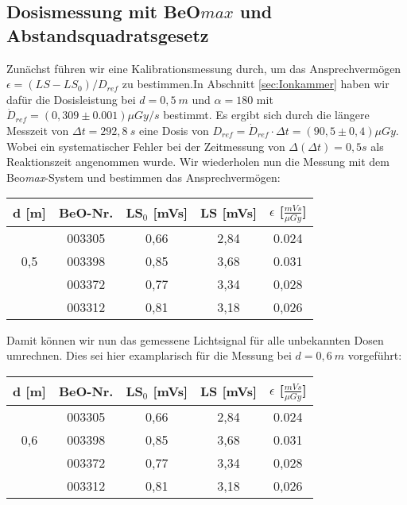 \subsection{Dosismessung mit BeO$max$ und Abstandsquadratsgesetz}
Zunächst führen wir eine Kalibrationsmessung durch, um das Ansprechvermögen $\epsilon = (LS - LS_0)/D_{ref}$ zu bestimmen.In Abschnitt \ref{sec:Ionkammer} haben wir dafür die Dosisleistung bei $d=0,5\ m$ und $\alpha = 180$ \textdegree  mit $\dot{D}_{ref} = (0,309 \pm 0.001)\mu Gy /s$ bestimmt. Es ergibt sich durch die längere Messzeit von $\Delta t = 292,8\ s$ eine Dosis von $D_{ref} = \dot{D}_{ref} \cdot \Delta t = (90,5 \pm 0,4)\mu Gy$. Wobei ein systematischer Fehler bei der Zeitmessung von $\Delta(\Delta t) = 0,5s$ als Reaktionszeit angenommen wurde. Wir wiederholen nun die Messung mit dem Beo\textit{max}-System und bestimmen das Ansprechvermögen:\\
	\begin{center}	
		\begin{tabular}{c|c|c|c|c}
					\textbf{d} [m] & BeO-Nr. & \textbf{LS$_0$} [mVs] & \textbf{LS} [mVs] & \textbf{$\epsilon$} [$\frac{mVs}{\mu Gy}$] \\
			\hline  
								& 003305 & 0,66 & 2,84 & 0.024\\
						0,5		& 003398 & 0,85 & 3,68 & 0.031\\
								& 003372 & 0,77 & 3,34 & 0,028\\
								& 003312 & 0,81 & 3,18 & 0,026\\								
		\end{tabular}
	\end{center}

Damit können wir nun das gemessene Lichtsignal für alle unbekannten Dosen umrechnen. Dies sei hier examplarisch für die Messung bei $d=0,6\ m$ vorgeführt:
	\begin{center}	
		\begin{tabular}{c|c|c|c|c}
					\textbf{d} [m] & BeO-Nr. & \textbf{LS$_0$} [mVs] & \textbf{LS} [mVs] & \textbf{$\epsilon$} [$\frac{mVs}{\mu Gy}$] \\
			\hline  
								& 003305 & 0,66 & 2,84 & 0.024\\
						0,6		& 003398 & 0,85 & 3,68 & 0.031\\
								& 003372 & 0,77 & 3,34 & 0,028\\
								& 003312 & 0,81 & 3,18 & 0,026\\
								
		\end{tabular}
	\end{center}
	
